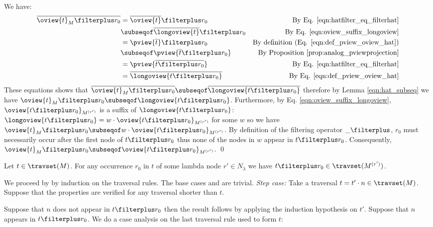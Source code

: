We have:
\begin{align*}
  \overline{\oview{t}_M\filterplus r_0}
        &= \overline{\oview{t}} \filterplus r_0 & \mbox{By Eq. \ref{eqn:hatfilter_eq_filterhat}} \\
        &\subseqof \overline{\longoview{t}} \filterplus r_0 & \mbox{By Eq. \ref{eqn:oview_suffix_longoview}} \\
        &= \pview{\overline{t}} \filterplus r_0 & \mbox{By definition (Eq. \ref{eqn:def_pview_oview_hat})} \\
        &\subseqof \pview{\overline{t} \filterplus r_0}  & \mbox{By Proposition \ref{prop:analog_pviewprojection}} \\
        &= \pview{\overline{t \filterplus r_0}}  & \mbox{By Eq. \ref{eqn:hatfilter_eq_filterhat}} \\
        &= \overline{\longoview{t \filterplus r_0}}  & \mbox{By Eq. \ref{eqn:def_pview_oview_hat}}
\end{align*}
These equations shows that $\overline{\oview{t}_M\filterplus r_0} \subseqof
\overline{\longoview{t \filterplus r_0}}$ therefore by Lemma
\ref{eqn:hat_subseq} we have $\oview{t}_M\filterplus r_0 \subseqof
\longoview{t \filterplus r_0}$. Furthermore, by Eq.
\ref{eqn:oview_suffix_longoview}, $\oview{t \filterplus
r_0}_{M^{(r')}}$ is a suffix of $\longoview{t \filterplus r_0}$:
$\longoview{t \filterplus r_0} = w \cdot \oview{t \filterplus
r_0}_{M^{(r')}}$ for some $w$ so we have $\oview{t}_M\filterplus r_0
\subseqof w \cdot \oview{t \filterplus r_0}_{M^{(r')}}$. By definition of the filtering operator $\_ \filterplus$, $r_0$ must
necessarily occur after the first node of $t \filterplus r_0$ thus
none of the nodes in $w$ appear in $t\filterplus r_0$. Consequently,
$\oview{t}_M\filterplus r_0 \subseqof \oview{t \filterplus
r_0}_{M^{(r')}}$. \qed

\begin{proposition}
    \label{prop:trav_filtering}
    Let $t \in \travset(M)$. For any occurrence $r_0$ in $t$ of some lambda node
    $r'\in N_\lambda$ we have $t\filterplus r_0 \in \travset(M^{(r')})$.
\end{proposition}
\proof
    We proceed by by induction on the traversal rules. The base cases  and
     are trivial. \emph{Step case:} Take a traversal $t = t' \cdot n
    \in \travset(M)$. Suppose that the properties are
    verified for any traversal shorter than $t$.

    Suppose that $n$ does not appear in $t \filterplus r_0$ then
    the result follows by applying the induction hypothesis on $t'$.
    Suppose that $n$ appears in $t \filterplus r_0$.
    We do a case analysis on the last traversal rule used to form $t$:


